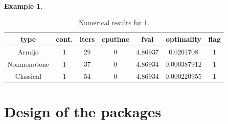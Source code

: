 \documentclass[a4paper]{article}
\newtheorem{example}{Example}
\newcommand{\mr}{\mathbb{R}}
\newcommand{\co}[1]{{\con{#1}}}
\begin{document}
  \begin{example}\label{exp3}
  \end{example}
  
  \begin{table}[p]
    \centering
    \begin{tabular}{cc|ccccc}
      \hline
      type & cont. & iters & cputime & 
      fval & optimality & flag \\ \hline
      Armijo & 1 & 29 & 0 & 4.86937 & 0.0201708 & 1 \\
      Nonmonotone & 1 & 37 & 0 & 4.86934 & 0.000387912 & 1 \\
      Classical & 1 & 54 & 0 & 4.86934 & 0.000220955 & 1 \\
      \hline
    \end{tabular}
    \caption{Numerical results for \cref{exp3}.}
    \label{tab3}
  \end{table}

  
  
  
  
  
  
  \appendix
  \renewcommand{\appendixname}{Appendix~\Alph{section}}
  
  
  \section{Design of the packages}
  \label{app:design}
  
\end{document}
